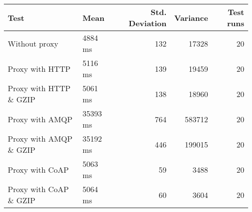\begin{tabularx}{\textwidth}{llrrr}
\hline
 Test                   & Mean     &   Std. Deviation &   Variance &   Test runs \\
\hline
 Without proxy          & 4884 ms  &              132 &      17328 &          20 \\
 Proxy with HTTP        & 5116 ms  &              139 &      19459 &          20 \\
 Proxy with HTTP \& GZIP & 5061 ms  &              138 &      18960 &          20 \\
 Proxy with AMQP        & 35393 ms &              764 &     583712 &          20 \\
 Proxy with AMQP \& GZIP & 35192 ms &              446 &     199015 &          20 \\
 Proxy with CoAP        & 5063 ms  &               59 &       3488 &          20 \\
 Proxy with CoAP \& GZIP & 5064 ms  &               60 &       3604 &          20 \\
\hline
\end{tabularx}